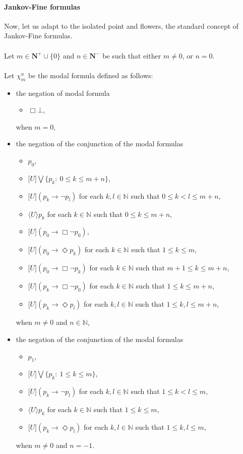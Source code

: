 \documentclass[draft]{article}
\def\N{\mathbb{N}}
\begin{document}
\paragraph{Jankov-Fine formulas}
%
%
Now, let us adapt to the isolated point and flowers, the standard concept of Jankov-Fine formulas.
%
%
\\
\\
%
%
Let $m{\in}\mathbf{N}^{+}{\cup}\{0\}$ and $n{\in}\mathbf{N}^{-}$ be such that either $m{\not=}0$, or $n{=}0$.
%
%
\\
\\
%
%
Let $\chi_{m}^{n}$ be the modal formula defined as follows:
%
%
\begin{itemize}
%
%
\item the negation of modal formula
%
%
\begin{itemize}
%
%
\item $\Box\bot$,
%
%
\end{itemize}
%
%
when $m{=}0$,
%
%
\item the negation of the conjunction of the modal formulas
%
%
\begin{itemize}
%
%
\item $p_{0}$,
%
%
\item $\lbrack U\rbrack\bigvee\{p_{k}:\ 0{\leq}k{\leq}m{+}n\}$,
%
%
\item $\lbrack U\rbrack(p_{k}\rightarrow\neg p_{l})$ for each $k,l{\in}\N$ such that $0{\leq}k{<}l{\leq}m{+}n$,
%
%
\item $\langle U\rangle p_{k}$ for each $k{\in}\N$ such that $0{\leq}k{\leq}m{+}n$,
%
%
\item $\lbrack U\rbrack(p_{0}\rightarrow\Box\neg p_{0})$,
%
%
\item $\lbrack U\rbrack(p_{0}\rightarrow\Diamond p_{k})$ for each $k{\in}\N$ such that $1{\leq}k{\leq}m$,
%
%
\item $\lbrack U\rbrack(p_{0}\rightarrow\Box\neg p_{k})$ for each $k{\in}\N$ such that $m{+}1{\leq}k{\leq}m{+}n$,
%
%
\item $\lbrack U\rbrack(p_{k}\rightarrow\Box\neg p_{0})$ for each $k{\in}\N$ such that $1{\leq}k{\leq}m{+}n$,
%
%
\item $\lbrack U\rbrack(p_{k}\rightarrow\Diamond p_{l})$ for each $k,l{\in}\N$ such that $1{\leq}k,l{\leq}m{+}n$,
%
%
\end{itemize}
%
%
when $m{\not=}0$ and $n{\in}\N$,
%
%
\item the negation of the conjunction of the modal formulas
%
%
\begin{itemize}
%
%
\item $p_{1}$,
%
%
\item $\lbrack U\rbrack\bigvee\{p_{k}:\ 1{\leq}k{\leq}m\}$,
%
%
\item $\lbrack U\rbrack(p_{k}\rightarrow\neg p_{l})$ for each $k,l{\in}\N$ such that $1{\leq}k{<}l{\leq}m$,
%
%
\item $\langle U\rangle p_{k}$ for each $k{\in}\N$ such that $1{\leq}k{\leq}m$,
%
%
\item $\lbrack U\rbrack(p_{k}\rightarrow\Diamond p_{l})$ for each $k,l{\in}\N$ such that $1{\leq}k,l{\leq}m$,
%
%
\end{itemize}
%
%
when $m{\not=}0$ and $n{=}{-}1$.
%
%
\end{itemize}
\end{document}
